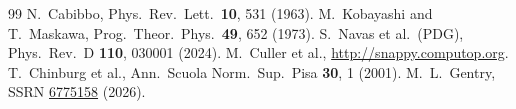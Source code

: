 \documentclass[11pt,a4paper]{article}
\begin{document}
\begin{thebibliography}{99}
N.~Cabibbo, Phys.\ Rev.\ Lett.\ \textbf{10}, 531 (1963).
M.~Kobayashi and T.~Maskawa, Prog.\ Theor.\ Phys.\ \textbf{49}, 652 (1973).
S.~Navas et al.\ (PDG), Phys.\ Rev.\ D \textbf{110}, 030001 (2024).
M.~Culler et al., \url{http://snappy.computop.org}.
T.~Chinburg et al., Ann.\ Scuola Norm.\ Sup.\ Pisa \textbf{30}, 1 (2001).
M.~L.~Gentry, SSRN \href{https://doi.org/10.2139/ssrn.6775158}{6775158} (2026).
\end{thebibliography}
\end{document}
